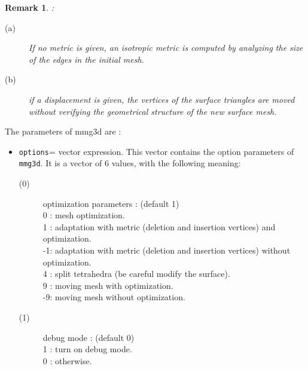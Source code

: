 \documentclass[a4paper,twoside,12pt]{book}
\newtheorem{remark}{Remark}
\begin{document}
\begin{remark} : 
\begin{description}
\item[(a)] If no metric is given, an isotropic metric is computed by analyzing the size of the edges in the initial mesh.
\item[(b)] if a displacement is given, the vertices of the surface triangles are moved without verifying the geometrical structure of the new surface mesh.
\end{description}
\end{remark}
The parameters of  mmg3d are :
\begin{itemize}\parskip=0cm
\item \texttt{options}= vector expression. This vector contains the option parameters of \texttt{mmg3d}. It is a vector of $6$ values, with the following meaning:
\begin{description}
\item[(0)]   optimization parameters : (default 1) \\
                     \hspace*{0.3cm}  0 : mesh optimization. \\
                     \hspace*{0.3cm}  1 : adaptation with metric (deletion and insertion vertices) and optimization. \\
                     \hspace*{0.3cm} -1: adaptation with metric (deletion and insertion vertices) without optimization. \\
                     \hspace*{0.3cm}  4 : split tetrahedra (be careful modify the surface). \\
                     \hspace*{0.3cm}  9 : moving mesh with optimization. \\
                     \hspace*{0.3cm} -9: moving mesh without optimization.

\item[(1)]  debug mode :  (default 0)\\
		 \hspace*{0.3cm} 1 : turn on debug mode.\\
		 \hspace*{0.3cm} 0 : otherwise.
		

\end{description}
\end{itemize}
\end{document}
